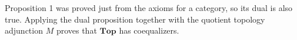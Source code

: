Proposition 1 was proved just from the axioms for a category, so its dual is also true. Applying the dual proposition together with the quotient topology adjunction $M$ proves that $\mathbf{Top}$ has coequalizers.
